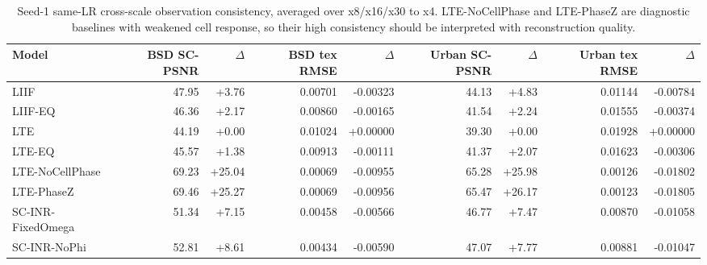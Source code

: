 \begin{table}[t]
\centering
\small
\caption{Seed-1 same-LR cross-scale observation consistency, averaged over x8/x16/x30 to x4. LTE-NoCellPhase and LTE-PhaseZ are diagnostic baselines with weakened cell response, so their high consistency should be interpreted with reconstruction quality.}
\label{tab:seed1_aux_consistency}
\begin{tabular}{lrrrrrrrr}
\toprule
Model & BSD SC-PSNR & $\Delta$ & BSD tex RMSE & $\Delta$ & Urban SC-PSNR & $\Delta$ & Urban tex RMSE & $\Delta$ \\
\midrule
LIIF & 47.95 & +3.76 & 0.00701 & -0.00323 & 44.13 & +4.83 & 0.01144 & -0.00784 \\
LIIF-EQ & 46.36 & +2.17 & 0.00860 & -0.00165 & 41.54 & +2.24 & 0.01555 & -0.00374 \\
LTE & 44.19 & +0.00 & 0.01024 & +0.00000 & 39.30 & +0.00 & 0.01928 & +0.00000 \\
LTE-EQ & 45.57 & +1.38 & 0.00913 & -0.00111 & 41.37 & +2.07 & 0.01623 & -0.00306 \\
LTE-NoCellPhase & 69.23 & +25.04 & 0.00069 & -0.00955 & 65.28 & +25.98 & 0.00126 & -0.01802 \\
LTE-PhaseZ & 69.46 & +25.27 & 0.00069 & -0.00956 & 65.47 & +26.17 & 0.00123 & -0.01805 \\
SC-INR-FixedOmega & 51.34 & +7.15 & 0.00458 & -0.00566 & 46.77 & +7.47 & 0.00870 & -0.01058 \\
SC-INR-NoPhi & 52.81 & +8.61 & 0.00434 & -0.00590 & 47.07 & +7.77 & 0.00881 & -0.01047 \\
\bottomrule
\end{tabular}
\end{table}
